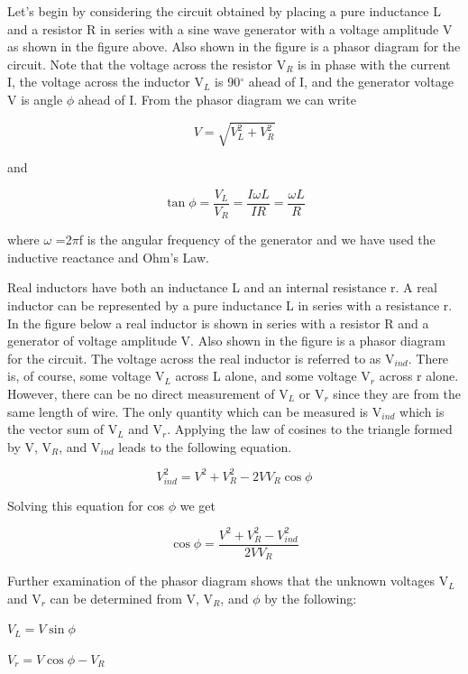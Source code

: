 Let's begin by considering the circuit obtained by placing a pure
inductance L and a resistor R in series with a sine wave generator
with a voltage amplitude V as shown in the figure above. Also shown
in the figure is a phasor diagram for the circuit. Note that the voltage
across the resistor V\( _{R} \) is in phase with the current I, the
voltage across the inductor V\( _{L} \) is 90\( ^{\circ } \) ahead
of I, and the generator voltage V is angle \( \phi  \) ahead of I.
From the phasor diagram we can write 

\[
V=\sqrt{V_{L}^{2}+V_{R}^{2}}\]


and 

\[
\tan \phi =\frac{V_{L}}{V_{R}}=\frac{I\omega L}{IR}=\frac{\omega L}{R}\]


where \( \omega  \) =2\( \pi  \)f is the angular frequency of
the generator and we have used the inductive reactance and Ohm's Law.

Real inductors have both an inductance L and an internal resistance
r. A real inductor can be represented by a pure inductance L in series
with a resistance r. In the figure below a real inductor is shown
in series with a resistor R and a generator of voltage amplitude V.
Also shown in the figure is a phasor diagram for the circuit. The
voltage across the real inductor is referred to as V\( _{ind} \).
There is, of course, some voltage V\( _{L} \) across L alone, and
some voltage V\( _{r} \) across r alone. However, there can be no
direct measurement of V\( _{L} \) or V\( _{r} \) since they are from the
same length of wire. The only quantity
which can be measured is V\( _{ind} \) which is the vector sum of
V\( _{L} \) and V\( _{r} \). Applying the law of cosines to the
triangle formed by V, V\( _{R} \), and V\( _{ind} \) leads to the
following equation.

\[
V_{ind}^{2}=V^{2}+V_{R}^{2}-2VV_{R}\cos \phi \]


Solving this equation for cos \( \phi  \) we get

\[
\cos \phi =\frac{V^{2}+V_{R}^{2}-V_{ind}^{2}}{2VV_{R}}\]


Further examination of the phasor diagram shows that the unknown voltages
V\( _{L} \) and V\( _{r} \) can be determined from V, V\( _{R} \),
and \( \phi  \) by the following: 

{\centering \( V_{L}=V\sin \phi  \) \par}

{\centering \( V_{r}=V\cos \phi -V_{R} \)\par}

